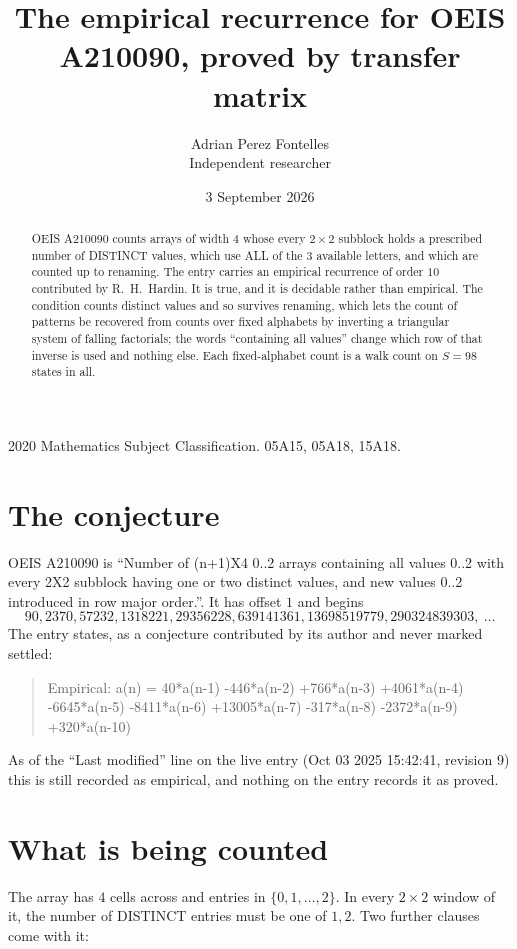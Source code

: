 \documentclass[11pt,a4paper]{article}
\title{The empirical recurrence for OEIS A210090, proved by transfer matrix}
\author{Adrian Perez Fontelles\\ \small Independent researcher}
\date{3 September 2026}
\theoremstyle{plain}
\theoremstyle{definition}
\begin{document}
\maketitle

\begin{abstract}
OEIS A210090 counts arrays of width $4$ whose every $2\times2$ subblock holds a
prescribed number of DISTINCT values, which use ALL of the $3$ available letters, and which
are counted up to renaming. The entry carries an empirical recurrence of order $10$
contributed by R.~H.~Hardin. It is true, and it is decidable rather than empirical. The
condition counts distinct values and so survives renaming, which lets the count of patterns be
recovered from counts over fixed alphabets by inverting a triangular system of falling
factorials; the words ``containing all values'' change which row of that inverse is used and
nothing else. Each fixed-alphabet count is a walk count on $S=98$ states in all.
\end{abstract}

\noindent\small 2020 Mathematics Subject Classification. 05A15, 05A18, 15A18.\normalsize

\section{The conjecture}

OEIS A210090 is ``Number of (n+1)X4 0..2 arrays containing all values 0..2 with every 2X2 subblock having one or two distinct values, and new values 0..2 introduced in row major order.''. It has offset $1$ and begins
\[
90, 2370, 57232, 1318221, 29356228, 639141361, 13698519779, 290324839303,\ \dots
\]
The entry states, as a conjecture contributed by its author and never marked settled:
\begin{quote}
Empirical: a(n) = 40*a(n-1) -446*a(n-2) +766*a(n-3) +4061*a(n-4) -6645*a(n-5) -8411*a(n-6) +13005*a(n-7) -317*a(n-8) -2372*a(n-9) +320*a(n-10)
\end{quote}
As of the ``Last modified'' line on the live entry (Oct 03 2025 15:42:41, revision 9) this is still
recorded as empirical, and nothing on the entry records it as proved.

\section{What is being counted}

The array has $4$ cells across and entries in $\{0,1,\dots,2\}$. In every
$2\times2$ window of it, the number of DISTINCT entries must be one of $1, 2$. Two
further clauses come with it:
\end{document}
